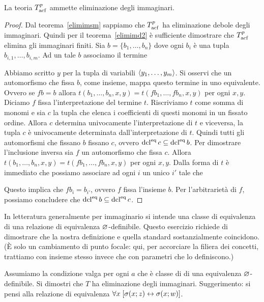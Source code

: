 \begin{theorem}\label{elimimacf} 
La teoria $T^p_{\rm acf}$ ammette eliminazione degli immaginari.
\end{theorem}

\begin{proof}
Dal teorema~\ref{elimimsm} sappiamo che $T^p_{\rm acf}$ ha eliminazione debole degli immaginari. Quindi per il teorema~\ref{elimimd2} \`e sufficiente dimostrare che $T^p_{\rm acf}$ elimina gli immaginari finiti. Sia $b=\{b_1,\dots,b_n\}$ dove ogni $b_i$ \`e una tupla $b_{i,1},\dots,b_{i,m}$. Ad un tale $b$ associamo il termine



Abbiamo scritto $y$ per la tupla di variabili $\langle y_1,\dots,y_m\rangle$. Si osservi che un automorfismo che fissa $b$, come insieme, mappa questo termine in uno equivalente. Ovvero se $fb=b$ allora $t(b_1,\dots,b_n,x,y)=t(fb_1,\dots,fb_n,x,y)$ per ogni $x,y$. Diciamo $f$ fissa l'interpretazione del termine $t$. Riscriviamo $t$ come somma di monomi e sia $c$ la tupla che elenca i coefficienti di questi monomi in un fissato ordine.  Allora $c$ determina univocamente l'interpretazione di $t$ e viceversa, la tupla $c$ \`e univocamente determinata dall'interpretazione di $t$. Quindi tutti gli automorfismi che fissano $b$ fissano $c$, ovvero $\mathop{\rm dcl}^{\rm eq} c\subseteq\mathop{\rm dcl}^{\rm eq} b$. Per dimostrare l'inclusione inversa sia $f$ un automorfismo che fissa $c$. Allora $t(b_1,\dots,b_n,x,y)=t(fb_1,\dots,fb_n,x,y)$ per ogni $x,y$. Dalla forma di $t$ \`e immediato che possiamo associare ad ogni $i$ un unico $i'$ tale che 


Questo implica che $fb_i=b_{i'}$, ovvero $f$ fissa l'insieme $b$. Per l'arbitrariet\`a di $f$, possiamo concludere che $\mathop{\rm dcl}^{\rm eq} b\subseteq\mathop{\rm dcl}^{\rm eq} c$.
\end{proof}



\begin{exercise}\label{eximmaginaristandard}
In letteratura generalmente per immaginario si intende una classe di equivalenza di una relazione di equivalenza $\varnothing$-definibile. Questo esercizio richiede di dimostrare che la nostra definizione e quella standard sostanzialmente coincidono. (\`E solo un cambiamento di punto focale: qui, per accorciare la filiera dei concetti, trattiamo con insieme stesso invece che con parametri che lo definiscono.)

Assumiamo la condizione  valga per ogni $a$ che \`e classe di di una equivalenza $\varnothing$-definibile. Si dimostri che $T$ ha eliminazione degli immaginari. Suggerimento: si pensi alla relazione di equivalenza $\forall x\;[\sigma(x;z)\leftrightarrow\sigma(x;w)]$.\QED
\end{exercise}

